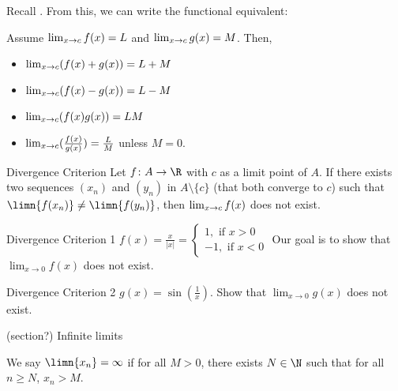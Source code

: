 Recall . From this, we can write the functional equivalent:

Assume \(\lim_{x \rightarrow c}f(x) = L\) and \(\lim_{x \rightarrow c}g(x) = M\). Then,
\begin{itemize}
    \item \(\lim_{x \rightarrow c}(f(x) + g(x)) = L + M\)
    \item \(\lim_{x \rightarrow c}(f(x) - g(x)) = L - M\)
    \item \(\lim_{x \rightarrow c}(f(x)g(x)) = LM\)
    \item \(\lim_{x \rightarrow c}(\frac{f(x)}{g(x)}) = \frac{L}{M}\) unless \(M = 0\).
\end{itemize}

\begin{ntheorem}
    {Divergence Criterion} Let \(f \colon A \rightarrow \R\) with \(c\) as a limit point of \(A\). If there exists two sequences \((x_n)\) and \((y_n)\) in \(A \setminus \{c\}\) (that both converge to \(c\)) such that \(\limn{f(x_n)} \ne \limn{f(y_n)}\), then \(\lim_{x \rightarrow c}f(x)\) does not exist.
\end{ntheorem}

\begin{example}
    {Divergence Criterion 1} \(f(x) = \frac{x}{|x|} = \begin{cases}
        1, \text{ if } x > 0 \\
        -1, \text{ if } x < 0
    \end{cases}\)
    Our goal is to show that \(\lim_{x \rightarrow 0} f(x)\) does not exist.
\end{example}


\begin{example}
    {Divergence Criterion 2} \(g(x) = \sin(\frac{1}{x})\). Show that \(\lim_{x \rightarrow 0} g(x)\) does not exist.
\end{example}


(section?) Infinite limits

We say \(\limn{x_n} = \infty\) if for all \(M > 0\), there exists \(N \in \N\) such that for all \(n \geq N\), \(x_n > M\).

